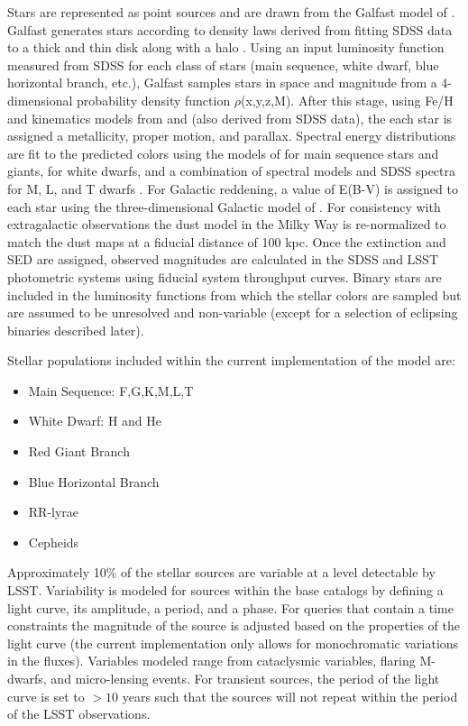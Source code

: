 \documentclass[]{article}
\begin{document}
{Stars are represented as point sources and are drawn from the Galfast model of \citep{galfast}.  
Galfast generates stars according to
density laws  derived from fitting SDSS data
to a thick and thin disk along with a halo \citep{juric}. Using an 
input luminosity function measured from SDSS for each class of stars 
(main sequence, white dwarf, blue horizontal branch, etc.), Galfast samples stars in space and magnitude 
from a 4-dimensional probability density function
$\rho$(x,y,z,M). After this stage, using Fe/H and kinematics models
from \citet{ivezic08} and \citet{bond09} (also derived from SDSS data), 
the each star is assigned a metallicity, proper motion, and parallax.
Spectral energy distributions are fit to the predicted
colors using the models of \citet{kuruczCD} for main sequence
stars and giants, \citet{bergeron95} for white dwarfs,
and a combination of spectral models and SDSS spectra for M, L, and T
dwarfs 
\citep[e.g.][]{cushing05,bochanski07,burrows06,pettersen89,kowalski10}. 
For Galactic reddening, a value of E(B-V) is assigned to each
star using the three-dimensional Galactic model of 
\citet{amores05}. For consistency with extragalactic observations the
dust model in the Milky Way is re-normalized to match the 
\citet{schlegel98} dust maps at a fiducial distance of 100 kpc.  Once the 
extinction and SED are assigned, observed magnitudes are calculated in
the SDSS and LSST photometric systems using fiducial system throughput curves.
Binary stars are included in the luminosity functions from which the
stellar colors are sampled but are assumed to be unresolved and
non-variable (except for a selection of eclipsing binaries described
later).

Stellar  populations included within the current implementation of the model are:
\begin{itemize}
\item Main Sequence: F,G,K,M,L,T
\item White Dwarf: H and He
\item Red Giant Branch
\item Blue Horizontal Branch
\item RR-lyrae
\item Cepheids
\end{itemize}

Approximately 10\% of the stellar sources are variable at a level detectable
by LSST.
Variability is modeled for sources within the base catalogs
by defining a light curve, its amplitude, a period, and a phase. For
queries that contain a time constraints the magnitude of the source is
adjusted based on the properties of the light curve (the current
implementation only allows for monochromatic variations in the
fluxes). Variables modeled range from cataclysmic variables, flaring
M-dwarfs, and micro-lensing events. For transient sources, the period
of the light curve is set to $>10$ years such that the sources will
not repeat within the period of the LSST observations.


}
\end{document}
